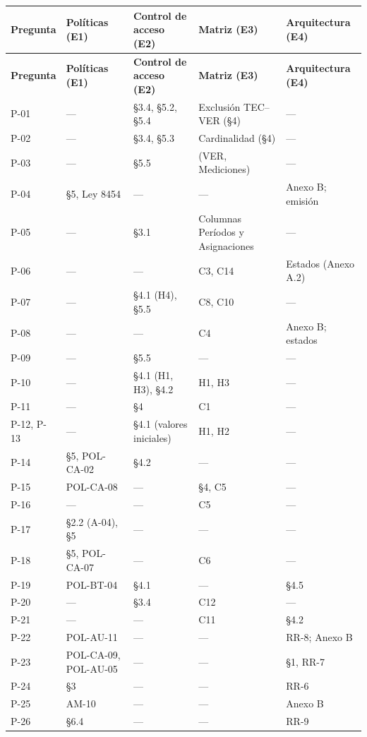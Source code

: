 \documentclass[11pt,letterpaper]{article}
\newcommand{\cab}[1]{\textbf{\sffamily #1}}
\begin{document}
{\small
\renewcommand{\arraystretch}{1.22}
\begin{longtable}{@{}L{1.3cm} L{3.3cm} L{3.8cm} L{3.4cm} L{3.4cm}@{}}
\toprule
\cab{Pregunta} & \cab{Políticas (E1)} & \cab{Control de acceso (E2)} & \cab{Matriz (E3)} & \cab{Arquitectura (E4)} \\
\midrule
\endfirsthead
\toprule
\cab{Pregunta} & \cab{Políticas (E1)} & \cab{Control de acceso (E2)} & \cab{Matriz (E3)} & \cab{Arquitectura (E4)} \\
\midrule
\endhead
\bottomrule
\endfoot
P-01 & --- & §3.4, §5.2, §5.4 & Exclusión TEC--VER (§4) & --- \\
P-02 & --- & §3.4, §5.3 & Cardinalidad (§4) & --- \\
P-03 & --- & §5.5 & (VER, Mediciones) & --- \\
P-04 & §5, Ley 8454 & --- & --- & Anexo B; emisión \\
P-05 & --- & §3.1 & Columnas Períodos y Asignaciones & --- \\
P-06 & --- & --- & C3, C14 & Estados (Anexo A.2) \\
P-07 & --- & §4.1 (H4), §5.5 & C8, C10 & --- \\
P-08 & --- & --- & C4 & Anexo B; estados \\
P-09 & --- & §5.5 & --- & --- \\
P-10 & --- & §4.1 (H1, H3), §4.2 & H1, H3 & --- \\
P-11 & --- & §4 & C1 & --- \\
P-12, P-13 & --- & §4.1 (valores iniciales) & H1, H2 & --- \\
P-14 & §5, POL-CA-02 & §4.2 & --- & --- \\
P-15 & POL-CA-08 & --- & §4, C5 & --- \\
P-16 & --- & --- & C5 & --- \\
P-17 & §2.2 (A-04), §5 & --- & --- & --- \\
P-18 & §5, POL-CA-07 & --- & C6 & --- \\
P-19 & POL-BT-04 & §4.1 & --- & §4.5 \\
P-20 & --- & §3.4 & C12 & --- \\
P-21 & --- & --- & C11 & §4.2 \\
P-22 & POL-AU-11 & --- & --- & RR-8; Anexo B \\
P-23 & POL-CA-09, POL-AU-05 & --- & --- & §1, RR-7 \\
P-24 & §3 & --- & --- & RR-6 \\
P-25 & AM-10 & --- & --- & Anexo B \\
P-26 & §6.4 & --- & --- & RR-9 \\
\end{longtable}
}
\end{document}
